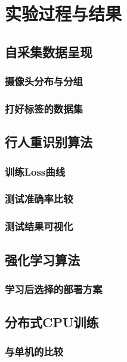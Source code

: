 \section{实验过程与结果}
\subsection{自采集数据呈现}

\subsubsection{摄像头分布与分组}

\subsubsection{打好标签的数据集}

\subsection{行人重识别算法}

\subsubsection{训练Loss曲线}

\subsubsection{测试准确率比较}

\subsubsection{测试结果可视化}

\subsection{强化学习算法}

\subsubsection{学习后选择的部署方案}

\subsection{分布式CPU训练}

\subsubsection{与单机的比较}

